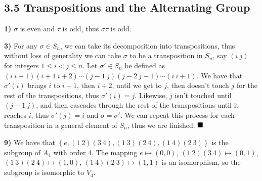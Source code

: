 \documentclass[12pt]{article}
\newcommand{\braceb}[1]{\left\{#1\right\}}
\newcommand{\done}{\ensuremath{\strut\hfill\blacksquare}}
\begin{document}
\subsection*{3.5 Transpositions and the Alternating Group}

\textbf{1)} \( \sigma \) is even and \( \tau \) is odd, thus \( \sigma\tau \)
is odd.

\textbf{3)} For any \( \sigma \in S_n \), we can take its decomposition into
transpositions, thus without loss of generality we can take \( \sigma \) to
be a transposition in \( S_n \), say \( (i\ j) \) for integers
\( 1 \leq i < j \leq n \).
Let \( \sigma' \in S_n \) be defined as
\( (i\ i+1)(i+1\ i+2)\cdots(j-1\ j)(j-2\ j-1)\cdots(i\ i+1) \).
We have that \( \sigma'(i) \) brings \( i \) to \( i + 1 \), then \( i + 2 \),
until we get to \( j \), then doesn't touch \( j \) for the rest of the
transpositions, thus \( \sigma'(i) = j \).
Likewise, \( j \) isn't touched until \( (j-1\ j) \), and then cascades through
the rest of the transpositions until it reaches \( i \), thus
\( \sigma'(j) = i \) and \( \sigma = \sigma' \).
We can repeat this process for each transposition in a general element of
\( S_n \), thus we are finished.
\done

\textbf{9)}
We have that \( \braceb{e,(1\ 2)(3\ 4),(1\ 3)(2\ 4), (1\ 4)(2\ 3)} \) is the
subgroup of \( A_4 \) with order 4.
The mapping \( e \mapsto (0,0) \), \( (1\ 2)(3\ 4) \mapsto (0,1) \),
\( (1\ 3)(2\ 4) \mapsto (1,0) \), \( (1\ 4)(2\ 3) \mapsto (1,1) \) is an
isomorphism, so the subgroup is isomorphic to \( V_4 \).
\end{document}
